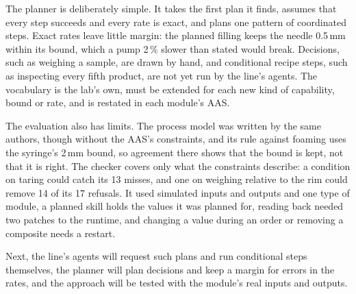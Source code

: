 \documentclass[5p,times,procedia]{elsarticle}
\begin{document}
The planner is deliberately simple. It takes the first plan it finds, assumes that every step succeeds and every rate is exact, and plans one pattern of coordinated steps. Exact rates leave little margin: the planned filling keeps the needle 0.5\,mm within its bound, which a pump 2\,\% slower than stated would break. Decisions, such as weighing a sample, are drawn by hand, and conditional recipe steps, such as inspecting every fifth product, are not yet run by the line's agents. The vocabulary is the lab's own, must be extended for each new kind of capability, bound or rate, and is restated in each module's AAS.

The evaluation also has limits. The process model was written by the same authors, though without the AAS's constraints, and its rule against foaming uses the syringe's 2\,mm bound, so agreement there shows that the bound is kept, not that it is right. The checker covers only what the constraints describe: a condition on taring could catch its 13 misses, and one on weighing relative to the rim could remove 14 of its 17 refusals. It used simulated inputs and outputs and one type of module, a planned skill holds the values it was planned for, reading back needed two patches to the runtime, and changing a value during an order or removing a composite needs a restart.

Next, the line's agents will request such plans and run conditional steps themselves, the planner will plan decisions and keep a margin for errors in the rates, and the approach will be tested with the module's real inputs and outputs.



\end{document}
